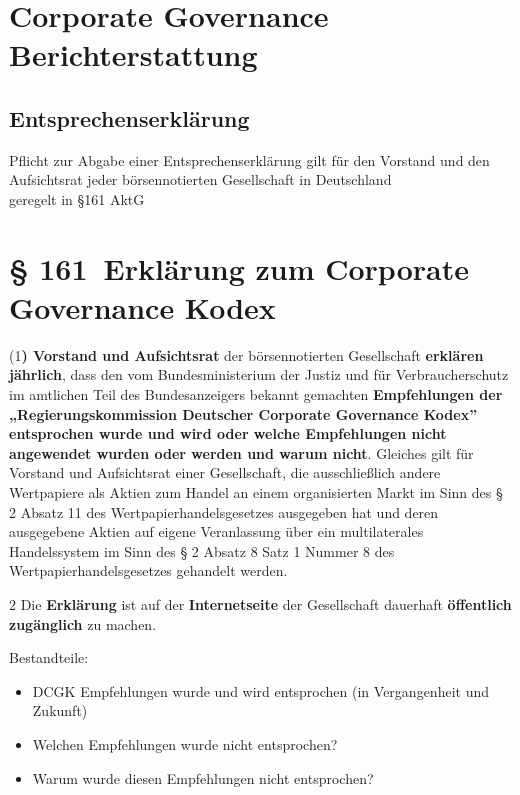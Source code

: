 \documentclass[
]{article}
\providecommand{\tightlist}{%
  \setlength{\itemsep}{0pt}\setlength{\parskip}{0pt}}
\begin{document}
\hypertarget{corporate-governance-berichterstattung}{%
\section{Corporate Governance
Berichterstattung}\label{corporate-governance-berichterstattung}}

\hypertarget{entsprechenserkluxe4rung}{%
\subsection{Entsprechenserklärung}\label{entsprechenserkluxe4rung}}

Pflicht zur Abgabe einer Entsprechenserklärung gilt für den Vorstand und
den Aufsichtsrat jeder börsennotierten Gesellschaft in Deutschland\\
geregelt in §161 AktG

\hypertarget{erkluxe4rung-zum-corporate-governance-kodex}{%
\section{§ 161~Erklärung zum Corporate Governance
Kodex}\label{erkluxe4rung-zum-corporate-governance-kodex}}

(1\textbf{) Vorstand und Aufsichtsrat} der börsennotierten Gesellschaft
\textbf{erklären jährlich}, dass den vom Bundesministerium der Justiz
und für Verbraucherschutz im amtlichen Teil des Bundesanzeigers bekannt
gemachten \textbf{Empfehlungen der „Regierungskommission Deutscher
Corporate Governance Kodex'' entsprochen wurde und wird oder welche
Empfehlungen nicht angewendet wurden oder werden und warum nicht}.
Gleiches gilt für Vorstand und Aufsichtsrat einer Gesellschaft, die
ausschließlich andere Wertpapiere als Aktien zum Handel an einem
organisierten Markt im Sinn des § 2 Absatz 11 des
Wertpapierhandelsgesetzes ausgegeben hat und deren ausgegebene Aktien
auf eigene Veranlassung über ein multilaterales Handelssystem im Sinn
des § 2 Absatz 8 Satz 1 Nummer 8 des Wertpapierhandelsgesetzes gehandelt
werden.

\(2\) Die \textbf{Erklärung} ist auf der \textbf{Internetseite} der
Gesellschaft dauerhaft \textbf{öffentlich zugänglich} zu machen.

Bestandteile:

\begin{itemize}
\tightlist
\item
  DCGK Empfehlungen wurde und wird entsprochen (in Vergangenheit und
  Zukunft)
\item
  Welchen Empfehlungen wurde nicht entsprochen?
\item
  Warum wurde diesen Empfehlungen nicht entsprochen?
\end{itemize}
\end{document}

